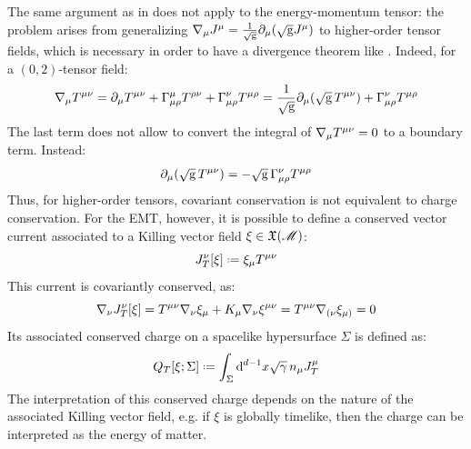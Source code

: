 The same argument as in  does not apply to the energy-momentum tensor: the problem arises from generalizing $ \nabla_\mu J^\mu = \frac{1}{\sqrt{\mathrm{g}}} \partial_\mu (\sqrt{\mathrm{g}} J^\mu) $ to higher-order tensor fields, which is necessary in order to have a divergence theorem like . Indeed, for a $ (0,2) $-tensor field:
\begin{equation*}
  \nabla_\mu T^{\mu \nu} = \partial_\mu T^{\mu \nu} + \Gamma^\mu_{\mu \rho} T^{\rho \nu} + \Gamma^\nu_{\mu \rho} T^{\mu \rho} = \frac{1}{\sqrt{\mathrm{g}}} \partial_\mu (\sqrt{\mathrm{g}}\, T^{\mu \nu}) + \Gamma^\nu_{\mu \rho} T^{\mu \rho}
\end{equation*}
The last term does not allow to convert the integral of $ \nabla_\mu T^{\mu \nu} = 0 $ to a boundary term. Instead:
\begin{equation}
  \partial_\mu (\sqrt{\mathrm{g}}\, T^{\mu \nu}) = -\sqrt{\mathrm{g}}\, \Gamma^\nu_{\mu \rho} T^{\mu \rho}
  \label{eq:no-div-th}
\end{equation}
Thus, for higher-order tensors, covariant conservation is not equivalent to charge conservation.
For the EMT, however, it is possible to define a conserved vector current associated to a Killing vector field $ \xi \in \mathfrak{X}(\mathscr{M}) $:
\begin{equation}
  J_T^\nu[\xi] \defeq \xi_\mu T^{\mu \nu}
\end{equation}
This current is covariantly conserved, as:
\begin{equation*}
  \nabla_\nu J_T^\nu[\xi] = T^{\mu \nu} \nabla_\nu \xi_\mu + K_\mu \nabla_\nu \xi^{\mu \nu} = T^{\mu \nu} \nabla_{(\nu} \xi_{\mu)} = 0
\end{equation*}
Its associated conserved charge on a spacelike hypersurface $ \Sigma $ is defined as:
\begin{equation}
  Q_T[\xi ; \Sigma] \defeq \int_\Sigma \dd^{d-1} x \sqrt{\gamma}\, n_\mu J_T^\mu
\end{equation}
The interpretation of this conserved charge depends on the nature of the associated Killing vector field, e.g. if $ \xi $ is globally timelike, then the charge can be interpreted as the energy of matter.


